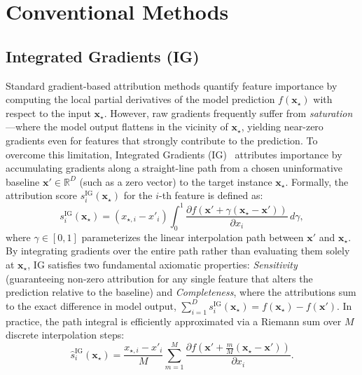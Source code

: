 \documentclass[pdflatex,sn-mathphys-num]{sn-jnl}
\theoremstyle{thmstyleone}
\theoremstyle{thmstyletwo}%
\theoremstyle{thmstylethree}%
\begin{document}
\section{Conventional Methods}\label{sec2}

\subsection{Integrated Gradients (IG)}
Standard gradient-based attribution methods quantify feature importance by computing the local partial derivatives of the model prediction $f(\mathbf{x}_\star)$ with respect to the input $\mathbf{x}_\star$. However, raw gradients frequently suffer from \emph{saturation}---where the model output flattens in the vicinity of $\mathbf{x}_\star$, yielding near-zero gradients even for features that strongly contribute to the prediction. To overcome this limitation, Integrated Gradients (IG)~\cite{sundararajan2017} attributes importance by accumulating gradients along a straight-line path from a chosen uninformative baseline $\mathbf{x}' \in \mathbb{R}^D$ (such as a zero vector) to the target instance $\mathbf{x}_\star$. Formally, the attribution score $s_i^{\text{IG}}(\mathbf{x}_\star)$ for the $i$-th feature is defined as:
\begin{equation}
    s_i^{\text{IG}}(\mathbf{x}_\star) = (x_{\star, i} - x'_i) \int_{0}^{1} \frac{\partial f(\mathbf{x}' + \gamma(\mathbf{x}_\star - \mathbf{x}'))}{\partial x_i} \, d\gamma,
\end{equation}
where $\gamma \in [0, 1]$ parameterizes the linear interpolation path between $\mathbf{x}'$ and $\mathbf{x}_\star$. By integrating gradients over the entire path rather than evaluating them solely at $\mathbf{x}_\star$, IG satisfies two fundamental axiomatic properties: \emph{Sensitivity} (guaranteeing non-zero attribution for any single feature that alters the prediction relative to the baseline) and \emph{Completeness}, where the attributions sum to the exact difference in model output, $\sum_{i=1}^D s_i^{\text{IG}}(\mathbf{x}_\star) = f(\mathbf{x}_\star) - f(\mathbf{x}')$. In practice, the path integral is efficiently approximated via a Riemann sum over $M$ discrete interpolation steps:
\begin{equation}
    \hat{s}_i^{\text{IG}}(\mathbf{x}_\star) = \frac{x_{\star, i} - x'_i}{M} \sum_{m=1}^{M} \frac{\partial f\left(\mathbf{x}' + \frac{m}{M}(\mathbf{x}_\star - \mathbf{x}')\right)}{\partial x_i}.
    \label{eq:ig_riemann}
\end{equation}
\end{document}
